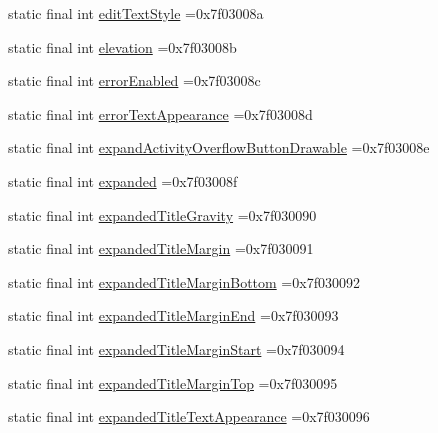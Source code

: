 \begin{DoxyCompactItemize}
\item 
static final int \mbox{\hyperlink{classbr_1_1unb_1_1cic_1_1mp_1_1marketmaster_1_1R_1_1attr_a7110ab4707d14bd241a3efbdc67bd593}{edit\+Text\+Style}} =0x7f03008a
\item 
static final int \mbox{\hyperlink{classbr_1_1unb_1_1cic_1_1mp_1_1marketmaster_1_1R_1_1attr_a7f7741adaa9fbcff1ef68ddb779062b7}{elevation}} =0x7f03008b
\item 
static final int \mbox{\hyperlink{classbr_1_1unb_1_1cic_1_1mp_1_1marketmaster_1_1R_1_1attr_a8e8672f13bc8ec15b779fd5fec77f516}{error\+Enabled}} =0x7f03008c
\item 
static final int \mbox{\hyperlink{classbr_1_1unb_1_1cic_1_1mp_1_1marketmaster_1_1R_1_1attr_a52938b5bd93a43cd2ba28742924a3d24}{error\+Text\+Appearance}} =0x7f03008d
\item 
static final int \mbox{\hyperlink{classbr_1_1unb_1_1cic_1_1mp_1_1marketmaster_1_1R_1_1attr_a5559c2f26df0c05e69f075da7516d1d0}{expand\+Activity\+Overflow\+Button\+Drawable}} =0x7f03008e
\item 
static final int \mbox{\hyperlink{classbr_1_1unb_1_1cic_1_1mp_1_1marketmaster_1_1R_1_1attr_af0819ad4f4e9a998555b89b7beeaa2ed}{expanded}} =0x7f03008f
\item 
static final int \mbox{\hyperlink{classbr_1_1unb_1_1cic_1_1mp_1_1marketmaster_1_1R_1_1attr_ac7cacddcdb842814bdf69170e903aaf9}{expanded\+Title\+Gravity}} =0x7f030090
\item 
static final int \mbox{\hyperlink{classbr_1_1unb_1_1cic_1_1mp_1_1marketmaster_1_1R_1_1attr_a34b70d22a29fa5e5a574ad3797bae8b7}{expanded\+Title\+Margin}} =0x7f030091
\item 
static final int \mbox{\hyperlink{classbr_1_1unb_1_1cic_1_1mp_1_1marketmaster_1_1R_1_1attr_ae54af90bfaec791effe9be75efbf23aa}{expanded\+Title\+Margin\+Bottom}} =0x7f030092
\item 
static final int \mbox{\hyperlink{classbr_1_1unb_1_1cic_1_1mp_1_1marketmaster_1_1R_1_1attr_a9ef0b50602dbfe6692a7568bf7090fb1}{expanded\+Title\+Margin\+End}} =0x7f030093
\item 
static final int \mbox{\hyperlink{classbr_1_1unb_1_1cic_1_1mp_1_1marketmaster_1_1R_1_1attr_a511b3738509b52f72ac33cf47ae6065e}{expanded\+Title\+Margin\+Start}} =0x7f030094
\item 
static final int \mbox{\hyperlink{classbr_1_1unb_1_1cic_1_1mp_1_1marketmaster_1_1R_1_1attr_ab2325eb61b0d0692f620770bd91d2e3b}{expanded\+Title\+Margin\+Top}} =0x7f030095
\item 
static final int \mbox{\hyperlink{classbr_1_1unb_1_1cic_1_1mp_1_1marketmaster_1_1R_1_1attr_aaa99eba7eef61c94803c14e314ae7cec}{expanded\+Title\+Text\+Appearance}} =0x7f030096

\end{DoxyCompactItemize}
